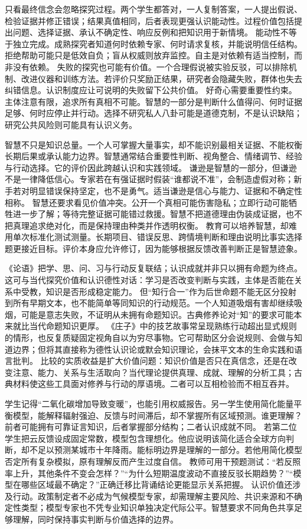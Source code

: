 只看最终信念会忽略探究过程。两个学生都答对，一人复制答案，一人提出假说、检验证据并修正错误；结果真值相同，后者表现更强认识能动性。过程价值包括提出问题、选择证据、承认不确定性、响应反例和把知识用于新情境。 能动性不等于独立完成。成熟探究者知道何时依赖专家、何时请求复核，并能说明信任结构。拒绝帮助可能只是低效自负；盲从权威则放弃监控。自主是对依赖有适当控制，而非没有依赖。 失败的探究也可能有价值。一个合理假说被实验反驳，可以排除机制、改进仪器和训练方法。若评价只奖励正结果，研究者会隐藏失败，群体也失去纠错信息。认识制度应让可说明的失败留下公共价值。 好奇心需要重要性约束。主体注意有限，追求所有真相不可能。智慧的一部分是判断什么值得问、何时证据足够、何时应停止并行动。选择不研究私人八卦可能是道德克制，不是认识缺陷；研究公共风险则可能具有认识义务。

智慧不只是知识总量。一个人可掌握大量事实，却不能识别最相关证据、不能权衡长期后果或承认能力边界。智慧通常结合重要性判断、视角整合、情绪调节、经验与行动选择。它的评价因此跨越认识和实践领域。 谦逊是智慧的一部分，但谦逊不是一律降低信心。专家若在有强证据时假装“谁都说不准”，会制造虚假对称；新手若对明显错误保持坚定，也不是勇气。适当谦逊是信心与能力、证据和不确定性相称。 智慧还要求看见价值冲突。公开一个真相可能伤害隐私；立即行动可能牺牲进一步了解；等待完整证据可能错过救援。智慧不把道德理由伪装成证据，也不把真理追求绝对化，而是保持理由种类并作透明权衡。 教育可以培养智慧，却难用单次标准化测试测量。长期项目、错误反思、跨情境判断和理由说明比事实选择题更接近目标。评价本身应允许修订，因为能够根据反馈改善判断正是智慧迹象。

《论语》把学、思、问、习与行动反复联结；认识成就并非只以拥有命题为终点\parencite{analects2003}。这可与当代探究价值和认识德性对话：学习是否改变判断与实践，主体是否能在关系中受教，知识是否形成稳定能力。 但“知行合一”作为后世命题不能无区分投射到所有早期文本，也不能简单等同知识的行动规范\parencite{tiwald2014}。一个人知道吸烟有害却继续吸烟，可能是意志失败，不证明从未拥有命题知识。古典修养论对“知”的要求可能本来就比当代命题知识更厚。 《庄子》中的技艺故事常呈现熟练行动超出显式规则的情形，也反复质疑固定视角自以为穷尽事物\parencite{zhuangzi2009}。它可帮助区分会说规则、会做与知道边界；但将其直接称为德性认识论或默会知识理论，会抹平文本的生命实践和语言批判。 比较的实质收益是扩大价值问题：知识价值是否只在真信念，还是在改变注意、能力、关系与生活取向？当代理论提供真理、成就、理解的分析工具；古典材料使这些工具面对修养与行动的厚语境。二者可以互相检验而不相互吞并。

学生记得“二氧化碳增加导致变暖”，也能引用权威报告。另一学生使用简化能量平衡模型，能解释辐射强迫、反馈与时间滞后，却不掌握所有区域预测。谁更理解？前者可能拥有可靠证言知识，后者掌握部分结构；二者认识成就不同。 若第二位学生把云反馈设成固定常数，模型包含理想化。他应说明该简化适合全球方向判断，却不足以预测某城市十年降雨。能标明边界是理解的一部分。若他用简化模型否定所有复杂模拟，原有理解反而产生过度自信。 教师可用干预题测试：“若反照率上升，其他条件不变会怎样？”“为什么短期温度波动不直接反驳长期趋势？”“模型在哪些区域最不确定？”正确迁移比背诵结论更能显示关系把握。 认识价值还涉及行动。政策制定者不必成为气候模型专家，却需理解主要风险、共识来源和不确定性类型；模型专家也不凭专业知识单独决定代际公平。智慧要求不同角色共享足够理解，同时保持事实判断与价值选择的边界。

